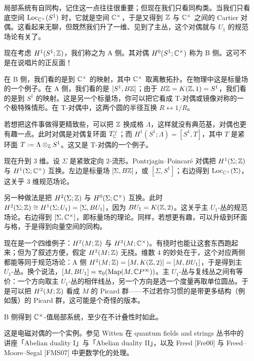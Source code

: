 局部系统有自同构，记住这一点往往很重要；但现在我们只看同构类。当我们只看底空间 $\mathrm{Loc}_{\mathbb{C}^\times}(S^1)$ 时，它就是空间 $\mathbb{C}^\times$，于是又得到 $\mathbb{Z}$ 与 $\mathbb{C}^\times$ 之间的 Cartier 对偶。这看起来无聊，但既然我们升了一维、见到了主丛，这个对偶就与 $U_1$ 的规范场论有关了。

\begin{example}[另一个二维例子]
  现在考虑 $H^1(S^1;\mathbb{Z})$，我们称之为 A 侧。其对偶 $H^0(S^1;\mathbb{C}^\times)$ 称为 B 侧。这可不是在说唱片的正反面！

  在 B 侧，我们看的是到 $\mathbb{C}^\times$ 的映射，其中 $\mathbb{C}^\times$ 取离散拓扑。在物理中这是标量场的一个例子。在 A 侧，我们看的是 $[S^1,B\mathbb{Z}]$；由于 $B\mathbb{Z} = K(\mathbb{Z},1) = S^1$，我们看的是到 $S^1$ 的映射。这是另一个标量场，你可以把它看成 T-对偶或镜像对称的一个极特殊情形。在 T-对偶中，这两个圆的半径互换 $R\leftrightarrow 1/R$。

  若想把这件事做得更精致些，可以把 $\mathbb{Z}$ 换成格 $\Lambda$，这样就没有典范基，对偶也更有趣一点。此时对偶是对偶复环面 $T^\vee_{\mathbb{C}}$；而 $H^1(S^1;\Lambda) = [S^1,T]$，其中 $T$ 是紧环面 $T := \Lambda\otimes_{\mathbb{Z}} S^1$。这又是 T-对偶的一个例子。
\end{example}

\begin{example}
  现在升到 $3$ 维。设 $\Sigma$ 是紧致定向 $2$-流形。Pontrjagin--Poincaré 对偶把 $H^1(\Sigma;\mathbb{Z})$ 与 $H^1(\Sigma;\mathbb{C}^\times)$ 互换。左边是标量场 $[\Sigma,B\mathbb{Z}]$，或 $[\Sigma,S^1]$；右边得到 $\mathrm{Loc}_{\mathbb{C}^\times}(\Sigma)$，这关乎 $3$ 维规范场论。

  另一种做法是把 $H^2(\Sigma;\mathbb{Z})$ 与 $H^0(\Sigma;\mathbb{C}^\times)$ 互换。此时 $H^2(\Sigma;\mathbb{Z})\cong H^1(\Sigma;U_1) = [\Sigma,BU_1]$，因为 $BU_1 = K(\mathbb{Z},2)$。这关乎主 $U_1$-丛的规范场论。右边得到 $[\Sigma,\mathbb{C}^\times]$，即标量场的理论。同样，若想更有趣，可以升级到环面与格，于是得到向量空间的同构。
\end{example}

\begin{example}
  现在是一个四维例子：$H^2(M;\mathbb{Z})$ 与 $H^2(M;\mathbb{C}^\times)$。有挠时也能让这套东西跑起来；但为了叙述方便，假定 $H^2(M;\mathbb{Z})$ 无挠。维数 $4$ 的妙处在于，这个对应两侧都能等同于规范场论：A 侧 $H^2(M;\mathbb{Z}) = [M,K(\mathbb{Z},2)] = [M,BU_1]$，于是得到主 $U_1$-丛。换个说法，$[M,BU_1] = \pi_0(\mathrm{Map}(M,\mathbb{C} P^\infty))$。主 $U_1$-丛与复线丛之间有等价：一个方向取主 $U_1$-丛的相伴线丛，另一个方向是选一个度量再取单位圆丛。于是可以把 $H^2(M;\mathbb{Z})$ 看成 $M$ 的 Picard 群——不过若你习惯的是带更多结构（例如簇）的 Picard 群，这可能是个奇怪的版本。

  B 侧得到 $\mathbb{C}^\times$-值局部系统，至少在不计叠性时如此。

  这是电磁对偶的一个实例。参见 Witten 在 quantum fields and strings 丛书中的讲座「Abelian duality I」与「Abelian duality II」，以及 Freed [Fre00] 与 Freed--Moore--Segal [FMS07] 中更数学化的处理。
\end{example}

